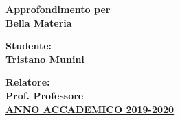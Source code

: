 \documentclass{article}
\begin{document}

\begin{titlepage}
 	\centering
  \Huge{\textbf{Approfondimento per\\ Bella Materia}}\\
 	[25mm]
  \raggedright
  \Large{\textbf{Studente:}}\\
  \Large{\textbf{Tristano Munini}}\\
 	[25mm]
  \raggedright
  \Large{\textbf{Relatore:}}\\
  \Large{\textbf{Prof. Professore}}\\
 	[80mm]
 	\centering
  \LARGE{\underline{\textbf{ANNO ACCADEMICO 2019-2020}}}\\
\end{titlepage}

\tableofcontents
\thispagestyle{empty}
\cleardoublepage
\setcounter{page}{1}




\cleardoublepage

%


%


\end{document}
